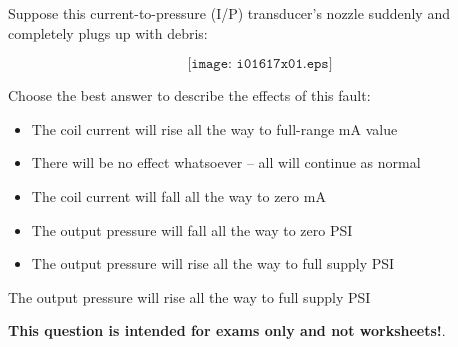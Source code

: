 

Suppose this current-to-pressure (I/P) transducer's nozzle suddenly and completely plugs up with debris:

$$\texttt{[image: i01617x01.eps]}$$

\noindent
Choose the best answer to describe the effects of this fault:

\begin{itemize}
\item{} The coil current will rise all the way to full-range mA value
\vskip 10pt
\item{} There will be no effect whatsoever -- all will continue as normal
\vskip 10pt
\item{} The coil current will fall all the way to zero mA 
\vskip 10pt
\item{} The output pressure will fall all the way to zero PSI
\vskip 10pt
\item{} The output pressure will rise all the way to full supply PSI 
\end{itemize}







The output pressure will rise all the way to full supply PSI 







{\bf This question is intended for exams only and not worksheets!}.



